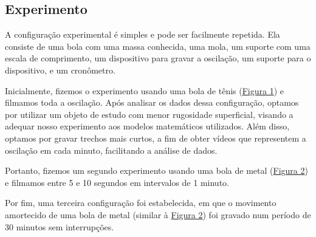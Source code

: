 \documentclass[a4paper, 12pt]{article}
\begin{document}
\begin{multicols}{2}
		\section{Experimento} \label{sec:experimento}
			\par A configuração experimental é simples e pode ser facilmente repetida. Ela consiste de uma bola com uma massa conhecida, uma mola, um suporte com uma escala de comprimento, um dispositivo para gravar a oscilação, um suporte para o dispositivo, e um cronômetro.
			\par Inicialmente, fizemos o experimento usando uma bola de tênis (\hyperref[img:tenis]{Figura 1}) e filmamos toda a oscilação. Após analisar os dados dessa configuração, optamos por utilizar um objeto de estudo com menor rugosidade superficial, visando a adequar nosso experimento aos modelos matemáticos utilizados. Além disso, optamos por gravar trechos mais curtos, a fim de obter vídeos que representem a oscilação em cada minuto, facilitando a análise de dados.
			\par Portanto, fizemos um segundo experimento usando uma bola de metal (\hyperref[img:metal]{Figura 2}) e filmamos entre 5 e 10 segundos em intervalos de 1 minuto.
			\par Por fim, uma terceira configuração foi estabelecida, em que o movimento amortecido de uma bola de metal (similar à \hyperref[img:metal]{Figura 2}) foi gravado num período de 30 minutos sem interrupções.
			\begin{figure}[H] \label{img:tenis}
				\centering

\end{figure}
\end{multicols}
\end{document}
